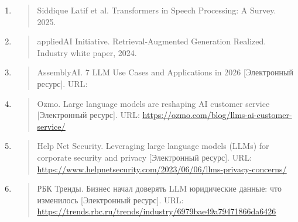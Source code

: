 \documentclass[
]{article}
\begin{document}
\begin{enumerate}
  \begin{quote}
  Patrick Lewis et al. Retrieval-Augmented Generation for
  Knowledge-Intensive NLP Tasks. 2020.
  \end{quote}
\item
  \begin{quote}
  Siddique Latif et al. Transformers in Speech Processing: A Survey.
  2025.
  \end{quote}
\item
  \begin{quote}
  appliedAI Initiative. Retrieval-Augmented Generation Realized.
  Industry white paper, 2024.
  \end{quote}
\item
  \begin{quote}
  AssemblyAI. 7 LLM Use Cases and Applications in 2026 {[}Электронный
  ресурс{]}. URL:
  \end{quote}
\item
  \begin{quote}
  Ozmo. Large language models are reshaping AI customer service
  {[}Электронный ресурс{]}. URL:
  \href{https://ozmo.com/blog/llms-ai-customer-service/}{\ul{https://ozmo.com/blog/llms-ai-customer-service/}}
  \end{quote}
\item
  \begin{quote}
  Help Net Security. Leveraging large language models (LLMs) for
  corporate security and privacy {[}Электронный ресурс{]}. URL:
  \href{https://www.helpnetsecurity.com/2023/06/06/llms-privacy-concerns/}{\ul{https://www.helpnetsecurity.com/2023/06/06/llms-privacy-concerns/}}
  \end{quote}
\item
  \begin{quote}
  РБК Тренды. Бизнес начал доверять LLM юридические данные: что
  изменилось {[}Электронный ресурс{]}. URL:
  \href{https://trends.rbc.ru/trends/industry/6979bae49a79471866da6426?utm_source=chatgpt.com\#_blank}{\ul{https://trends.rbc.ru/trends/industry/6979bae49a79471866da6426}}
  \end{quote}
\end{enumerate}
\end{document}
